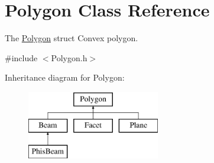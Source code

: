 \hypertarget{class_polygon}{}\section{Polygon Class Reference}
\label{class_polygon}


The \mbox{\hyperlink{class_polygon}{Polygon}} struct Convex polygon.  




{\ttfamily \#include $<$Polygon.\+h$>$}

Inheritance diagram for Polygon\+:\begin{figure}[H]
\begin{center}
\leavevmode
\includegraphics[height=3.000000cm]{class_polygon}
\end{center}
\end{figure}
